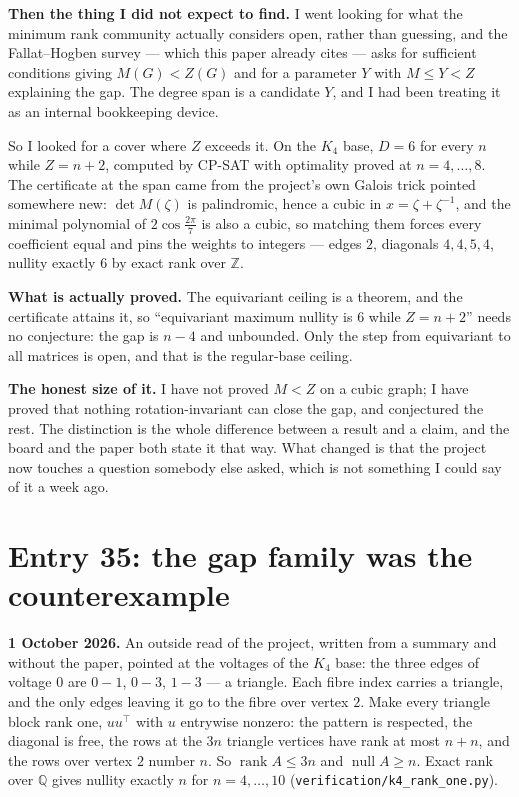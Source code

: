 \documentclass[12pt]{article}
\begin{document}
\textbf{Then the thing I did not expect to find.} I went looking for what the
minimum rank community actually considers open, rather than guessing, and the
Fallat--Hogben survey --- which this paper already cites --- asks for sufficient
conditions giving $M(G)<Z(G)$ and for a parameter $Y$ with $M\le Y<Z$ explaining
the gap. The degree span is a candidate $Y$, and I had been treating it as an
internal bookkeeping device.

So I looked for a cover where $Z$ exceeds it. On the $K_4$ base, $D=6$ for every
$n$ while $Z=n+2$, computed by CP-SAT with optimality proved at
$n=4,\dots,8$. The certificate at the span came from the project's own Galois
trick pointed somewhere new: $\det M(\zeta)$ is palindromic, hence a cubic in
$x=\zeta+\zeta^{-1}$, and the minimal polynomial of $2\cos\frac{2\pi}{7}$ is also
a cubic, so matching them forces every coefficient equal and pins the weights to
integers --- edges $2$, diagonals $4,4,5,4$, nullity exactly $6$ by exact rank
over $\mathbb Z$.

\textbf{What is actually proved.} The equivariant ceiling is a theorem, and the
certificate attains it, so ``equivariant maximum nullity is $6$ while $Z=n+2$''
needs no conjecture: the gap is $n-4$ and unbounded. Only the step from
equivariant to all matrices is open, and that is the regular-base ceiling.

\textbf{The honest size of it.} I have not proved $M<Z$ on a cubic graph; I have
proved that nothing rotation-invariant can close the gap, and conjectured the
rest. The distinction is the whole difference between a result and a claim, and
the board and the paper both state it that way. What changed is that the project
now touches a question somebody else asked, which is not something I could say
of it a week ago.

\section*{Entry 35: the gap family was the counterexample}

\textbf{1 October 2026.} An outside read of the project, written from a summary
and without the paper, pointed at the voltages of the $K_4$ base: the three
edges of voltage $0$ are $0\!-\!1$, $0\!-\!3$, $1\!-\!3$ --- a triangle. Each
fibre index carries a triangle, and the only edges leaving it go to the fibre
over vertex $2$. Make every triangle block rank one, $uu^{\top}$ with $u$
entrywise nonzero: the pattern is respected, the diagonal is free, the rows at
the $3n$ triangle vertices have rank at most $n+n$, and the rows over vertex $2$
number $n$. So $\operatorname{rank}A\le3n$ and $\operatorname{null}A\ge n$.
Exact rank over $\mathbb Q$ gives nullity exactly $n$ for $n=4,\dots,10$
(\texttt{verification/k4\_rank\_one.py}).
\end{document}

